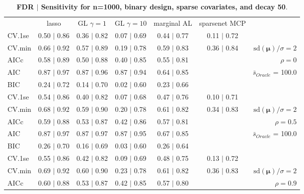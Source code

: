 \clearpage
\begin{table}\vspace{-.5cm}
\caption[l]{ {\it }
{ \bf FDR $\boldsymbol{\mid}$ Sensitivity for n=1000, binary design, sparse covariates, and  decay  50}.}
\vspace{-.5cm}
\footnotesize{}
\begin{center}
\begin{tabular}{l*{5}{c}|r}
 & lasso & GL $\gamma=1$ & GL $\gamma=10$ & marginal AL & sparsenet MCP  & \\
 \cline{1-7}
CV.1se & 0.50 $\mid$ 0.86 & 0.36 $\mid$ 0.82 & 0.07 $\mid$ 0.69 & 0.44 $\mid$ 0.77 & 0.11 $\mid$ 0.72 & \\
CV.min & 0.66 $\mid$ 0.92 & 0.57 $\mid$ 0.89 & 0.19 $\mid$ 0.78 & 0.59 $\mid$ 0.83 & 0.36 $\mid$ 0.84 &  $\mathrm{sd}(\mathbf{\mu})/\sigma=2$ \\
AICc & 0.58 $\mid$ 0.89 & 0.50 $\mid$ 0.88 & 0.40 $\mid$ 0.85 & 0.55 $\mid$ 0.81 & & $\rho=0$ \\
AIC & 0.87 $\mid$ 0.97 & 0.87 $\mid$ 0.96 & 0.87 $\mid$ 0.94 & 0.64 $\mid$ 0.85 & &  \multirow{2}{*}{$\bar{s}_{Oracle}$ = 100.0} \\
BIC & 0.24 $\mid$ 0.72 & 0.14 $\mid$ 0.70 & 0.02 $\mid$ 0.60 & 0.23 $\mid$ 0.66 & &  \\
 \hline 
CV.1se & 0.54 $\mid$ 0.86 & 0.40 $\mid$ 0.82 & 0.07 $\mid$ 0.68 & 0.47 $\mid$ 0.76 & 0.10 $\mid$ 0.71 & \\
CV.min & 0.68 $\mid$ 0.92 & 0.59 $\mid$ 0.90 & 0.20 $\mid$ 0.78 & 0.61 $\mid$ 0.82 & 0.34 $\mid$ 0.83 &  $\mathrm{sd}(\mathbf{\mu})/\sigma=2$ \\
AICc & 0.59 $\mid$ 0.88 & 0.53 $\mid$ 0.87 & 0.42 $\mid$ 0.86 & 0.57 $\mid$ 0.81 & & $\rho=0.5$ \\
AIC & 0.87 $\mid$ 0.97 & 0.87 $\mid$ 0.97 & 0.87 $\mid$ 0.95 & 0.67 $\mid$ 0.85 & &  \multirow{2}{*}{$\bar{s}_{Oracle}$ = 100.0} \\
BIC & 0.26 $\mid$ 0.70 & 0.16 $\mid$ 0.69 & 0.03 $\mid$ 0.60 & 0.26 $\mid$ 0.64 & &  \\
 \hline 
CV.1se & 0.55 $\mid$ 0.86 & 0.42 $\mid$ 0.82 & 0.09 $\mid$ 0.69 & 0.48 $\mid$ 0.75 & 0.13 $\mid$ 0.72 & \\
CV.min & 0.69 $\mid$ 0.92 & 0.60 $\mid$ 0.90 & 0.23 $\mid$ 0.78 & 0.61 $\mid$ 0.82 & 0.36 $\mid$ 0.83 &  $\mathrm{sd}(\mathbf{\mu})/\sigma=2$ \\
AICc & 0.60 $\mid$ 0.88 & 0.53 $\mid$ 0.87 & 0.42 $\mid$ 0.85 & 0.57 $\mid$ 0.80 & & $\rho=0.9$ \\

\end{tabular}
\end{center}
\end{table}
